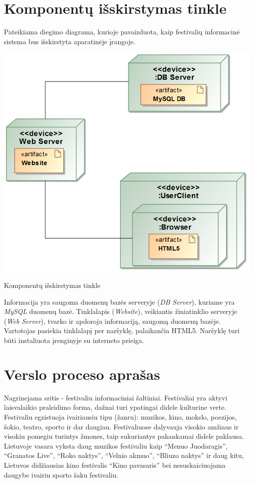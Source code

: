 ﻿\documentclass{VUMIFPSkursinis}
\begin{document}
\section{Komponentų išskirstymas tinkle}
Pateikiama diegimo diagrama, kurioje pavaizduota, kaip festivalių informacinė sistema bus išskirstyta aparatinėje įrangoje. 
\begin{center}
    \includegraphics[scale=0.5]{img/PSI3/deploy.PNG}
	\label{uml:22}
	\caption{Komponentų išskirstymas tinkle}
\end{center}
Informacija yra saugoma duomenų bazės serveryje (\textit{DB Server}), kuriame yra \textit{MySQL} duomenų bazė. Tinklalapis (\textit{Website}), veikiantis žiniatinklio serveryje (\textit{Web Server}), tvarko ir apdoroja informaciją, saugomą duomenų bazėje. Vartotojas pasiekia tinklalapį per naršyklę, palaikančia HTML5. Naršyklę turi būti instaliuota įrenginyje su interneto prieiga.


\section{Verslo proceso aprašas}

Nagrinejama sritis - festivaliu informaciniai šaltiniai. 
Festivaliai yra aktyvi laisvalaikio praleidimo forma, dažnai turi ypatingai didele kulturine verte. 
Festivaliu egzistuoja ivairiausiu tipu (žanru): muzikos, kino, mokslo, poezijos, šokio, teatro, sporto ir dar daugiau. 
Festivaliuose dalyvauja visokio amžiaus ir visokiu pomegiu turintys žmones, taip sukuriantys pakankamai didele paklausa. 
Lietuvoje vasara vyksta daug muzikos festivaliu kaip “Menuo Juodaragis”, “Granatos Live”, “Roko naktys”, “Velnio akmuo”, “Bliuzo naktys” ir daug kitu,
 Lietuvos didžiausias kino festivalis “Kino pavasaris” bei nesuskaiciuojama daugybe ivairiu sporto šaku festivaliu.
\end{document}
